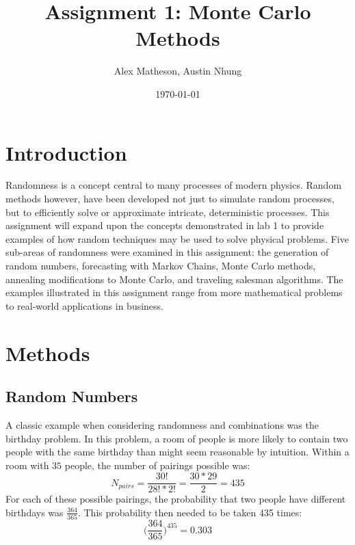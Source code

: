 \message{ !name(Assn1.tex)}\documentclass[twocolumn]{article}
\begin{document}

\title{Assignment 1: Monte Carlo Methods}
\author{Alex Matheson, Austin Nhung}
\date{\today}
\maketitle

\section{Introduction}
Randomness is a concept central to many processes of modern physics. Random methods however, have been developed not just to simulate random processes, but to efficiently solve or approximate intricate, deterministic processes. This assignment will expand upon the concepts demonstrated in lab 1 to provide examples of how random techniques may be used to solve physical problems. Five sub-areas of randomness were examined in this assignment: the generation of random numbers, forecasting with Markov Chains, Monte Carlo methods, annealing modifications to Monte Carlo, and traveling salesman algorithms. The examples illustrated in this assignment range from more mathematical problems to real-world applications in business.

\section{Methods}
\subsection{Random Numbers}
A classic example when considering randomness and combinations was the birthday problem. In this problem, a room of people is more likely to contain two people with the same birthday than might seem reasonable by intuition. Within a room with $35$ people, the number of pairings possible was:
\begin{equation}
N_{pairs} = \frac{30!}{28!*2!} = \frac{30*29}{2} = 435
\end{equation}
For each of these possible pairings, the probability that two people have different birthdays was $\frac{364}{365}$. This probability then needed to be taken 435 times:
\begin{equation}
\bigg( \frac{364}{365} \bigg)^{435} = 0.303
\end{equation}
\end{document}
